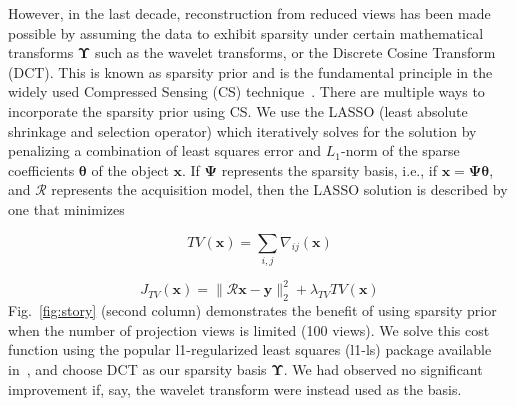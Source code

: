 \documentclass[journal]{IEEEtran}
\begin{document}
However, in the last decade, reconstruction from reduced views has
been made possible by assuming the data to exhibit sparsity under
certain mathematical transforms $\boldsymbol{\Upsilon}$ such as the
wavelet transforms, or the Discrete Cosine Transform (DCT). This is
known as sparsity prior and is the fundamental principle in the widely
used Compressed Sensing (CS) technique~\cite{Donoho,introCS}.  There
are multiple ways to incorporate the sparsity prior using CS. We use
the LASSO (least absolute shrinkage and selection operator) which
iteratively solves for the solution by penalizing a combination of
least squares error and $L_1$-norm of the sparse coefficients
$\boldsymbol{\theta}$ of the object $\boldsymbol{x}$. If $\boldsymbol{\Psi}$
represents the sparsity basis, i.e., if $\boldsymbol{x} = \boldsymbol{\Psi\theta}$, and 
$\boldsymbol{\mathcal{R}}$ represents the acquisition model, then the
LASSO solution is described by one that minimizes


 \begin{equation}
   TV(\boldsymbol{x}) = \sum_{i,j}\nabla_{ij}(\boldsymbol{x})
   \label{Eq:definition_TV}
\end{equation}
 

 \begin{equation}
   J_{TV}(\boldsymbol{x}) = \lVert\boldsymbol{\mathcal{R}x}- \boldsymbol{y}\rVert_2^2 + \lambda_{TV}TV(\boldsymbol{x})
   \label{Eq:simple_TV}
   \end{equation}
 Fig.~\ref{fig:story}
 (second column) demonstrates the benefit of using sparsity prior when
 the number of projection views is limited (100 views).
 We solve this cost function using the popular l1-regularized least
 squares (l1-ls) package available in~\cite{l1ls}, and choose DCT as
 our sparsity basis $\boldsymbol{\Upsilon}$. We had observed no significant improvement if, say, the wavelet transform were instead used as the basis.  

\end{document}
